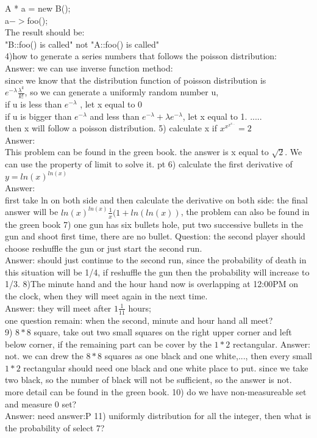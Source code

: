 \documentclass[12pt]{article}
\theoremstyle{plain}
\begin{document}
A * a = new B();\\
a$->$foo();   \\
The result should be:\\
"B::foo() is called" not "A::foo() is called"\\
4)how to generate a series numbers that follows the poisson distribution:\\
Answer: we can use inverse function method:\\
since we know that the distribution function of poisson distribution is \\
$e^{-\lambda}\frac{\lambda^k}{k!}$,
so we can generate a uniformly random number u,\\
if u is less than $e^{-\lambda}$ , let x equal to 0\\
if u is bigger than $e^{-\lambda}$ and less than $e^{-\lambda}+\lambda e^{-\lambda}$, let x equal to 1.
.....\\
then x will follow a poisson distribution.
\vskip 10pt
5) calculate x if $x^{x^{x^{x...}}}=2$\\
Answer:\\
This problem can be found in the green book.
the answer is x equal to $\sqrt{2}$. We can use the property of limit to solve it.
 pt
6) calculate the first derivative of $y=ln(x)^{ln(x)}$\\
Answer:\\
first take ln on both side and then calculate the derivative on both side: the final answer will be $ln(x)^{ln(x)}\frac{1}{x}(1+ln(ln(x))$, the problem can also be found in the green book
\vskip 10pt
7) one gun has six bullets hole, put two successive bullets in the gun and shoot first time, there are no bullet. Question: the second player should choose reshuffle the gun or just start the second run. \\
Answer: should just continue to the second run, since the probability of death in this situation will be 1/4, if reshuffle the gun then the probability will increase to 1/3.
\vskip 10pt
8)The minute hand and the hour hand now is overlapping at 12:00PM on the clock, when they will meet again in the next time.\\
Answer: they will meet after $1\frac{1}{11}$ hours;\\
one question remain: when the second, minute and hour hand all meet?\\
\vskip 10pt
9) $8*8$ square, take out two small squares on the right upper corner and left below corner, if the remaining part can be cover by the $1*2$ rectangular.
Answer: not. we can drew the $8*8$ squares as one black and one white,..., then every small $1*2$ rectangular should need one black and one white place to put. since we take two black, so the number of black will not be sufficient, so the answer is not. more detail can be found in the green book.
\vskip 10pt
10) do we have non-measureable set and measure 0 set?\\
Answer: need answer:P
\vskip 10pt
11) uniformly distribution for all the integer, then what is the probability of select 7?
\end{document}
